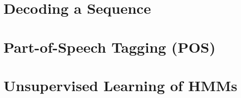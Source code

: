 \section{\label{decoding} Decoding a Sequence}


\section{\label{pos-tagging} Part-of-Speech Tagging (POS)}


\section{\label{unsupervised} Unsupervised Learning of HMMs}



%

%


